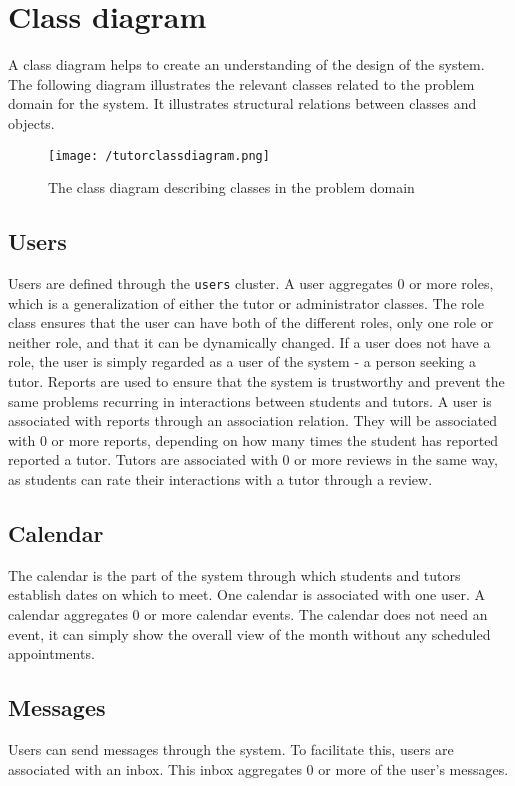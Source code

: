 \section{Class diagram}
A class diagram helps to create an understanding of the design of the system.
The following diagram illustrates the relevant classes related to the problem domain for the system.
It illustrates structural relations between classes and objects\cite{OOAD}.

\begin{figure}[H]
    \texttt{[image: /tutorclassdiagram.png]}
     \caption{The class diagram describing classes in the problem domain}
     \label{fig:class-diagram}
 \end{figure}

\subsection{Users}
Users are defined through the \texttt{users} cluster.
A user aggregates 0 or more roles, which is a generalization of either the tutor or administrator classes.
The role class ensures that the user can have both of the different roles, only one role or neither role, and that it can be dynamically changed.
If a user does not have a role, the user is simply regarded as a user of the system - a person seeking a tutor.
Reports are used to ensure that the system is trustworthy and prevent the same problems recurring in interactions between students and tutors.
A user is associated with reports through an association relation.
They will be associated with 0 or more reports, depending on how many times the student has reported reported a tutor.
Tutors are associated with 0 or more reviews in the same way, as students can rate their interactions with a tutor through a review.

\subsection{Calendar}
The calendar is the part of the system through which students and tutors establish dates on which to meet.
One calendar is associated with one user.
A calendar aggregates 0 or more calendar events.
The calendar does not need an event, it can simply show the overall view of the month without any scheduled appointments.

\subsection{Messages}
Users can send messages through the system.
To facilitate this, users are associated with an inbox.
This inbox aggregates 0 or more of the user's messages.

